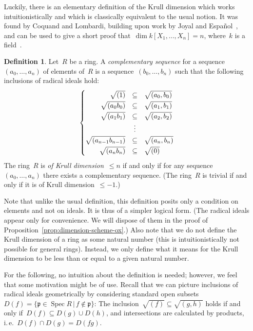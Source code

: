 \documentclass[10pt,reqno,a4paper]{amsbook}
\makeatletter
\theoremstyle{definition}
\newtheorem{defn}{Definition}[section]
\theoremstyle{plain}
\theoremstyle{remark}
\newcommand{\ppp}{\mathfrak{p}}
\DeclareMathOperator{\Spec}{Spec}
\newcommand{\?}{\,{:}\,}
\renewcommand{\_}{\mathpunct{.}\,}
\newcommand{\ie}{i.\,e.\@\xspace}
\makeatother
\begin{document}
Luckily, there is an elementary definition of the Krull dimension which works
intuitionistically and which is classically equivalent to the usual notion. It
was found by Coquand and Lombardi, building upon work by
Joyal and Español~\cite{dyn:krull-integral,dyn:char-krull}, and can be
used to give a short proof that~$\dim k[X_1,\ldots,X_n] = n$, where~$k$ is a
field~\cite{dyn:krull-dim-polynomial-ring}.

\begin{defn}Let~$R$ be a ring. A \emph{complementary sequence} for a
sequence~$(a_0,\ldots,a_n)$ of elements of~$R$ is a sequence~$(b_0,\ldots,b_n)$
such that the following inclusions of radical ideals hold:
\[ \renewcommand{\arraystretch}{1.3}
\left\{\begin{array}{@{}rcl@{}}
  \sqrt{(1)} &\subseteq& \sqrt{(a_0,b_0)} \\
  \sqrt{(a_0 b_0)} &\subseteq& \sqrt{(a_1,b_1)} \\
  \sqrt{(a_1 b_1)} &\subseteq& \sqrt{(a_2,b_2)} \\
  &\vdots \\
  \sqrt{(a_{n-1} b_{n-1})} &\subseteq& \sqrt{(a_n,b_n)} \\
  \sqrt{(a_n b_n)} &\subseteq& \sqrt{(0)}
\end{array}\right. \]
The ring~$R$ is \emph{of Krull dimension~$\leq n$} if
and only if for any sequence~$(a_0,\ldots,a_n)$ there exists a
complementary sequence. (The ring~$R$ is trivial if and only if it is
of Krull dimension~$\leq -1$.)
\end{defn}
Note that unlike the usual definition, this definition posits only a condition
on elements and not on ideals. It is thus of a simpler logical form.
(The radical ideals appear only for convenience. We will dispose of them in the
proof of Proposition~\ref{prop:dimension-scheme-ox}.)
Also note that we do not define the Krull dimension of a ring as some natural
number (this is intuitionistically not possible for general rings). Instead, we
only define what it means for the Krull dimension to be less than or equal to
a given natural number.

For the following, no intuition about the definition is needed; however, we
feel that some motivation might be of use. Recall that we can picture inclusions of
radical ideals geometrically by considering standard open subsets~$D(f) = \{
\ppp \in \Spec R \,|\, f \not\in \ppp \}$: The inclusion~$\sqrt{(f)} \subseteq
\sqrt{(g,h)}$ holds if and only if~$D(f) \subseteq D(g) \cup D(h)$, and
intersections are calculated by products, \ie~$D(f) \cap D(g) = D(fg)$.
\end{document}
